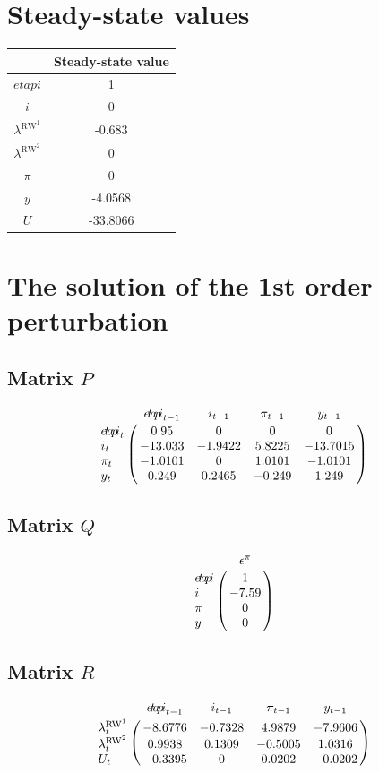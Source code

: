 

\section{Steady-state values}


\begin{tabular}{c|c|}
  & Steady-state value\\
\hline
${e\!t\!a\!p\!i}$ & 1 \\
$i$ & 0 \\
$\lambda^{\mathrm{RW}^{\mathrm{1}}}$ & -0.683 \\
$\lambda^{\mathrm{RW}^{\mathrm{2}}}$ & 0 \\
$\pi$ & 0 \\
$y$ & -4.0568 \\
$U$ & -33.8066 \\
\hline
\end{tabular}


\section{The solution of the 1st order perturbation}

\subsection*{Matrix $P$}

$$\bordermatrix{
~ & {e\!t\!a\!p\!i}_{t-1} & i_{t-1} & \pi_{t-1} & y_{t-1} \cr
{e\!t\!a\!p\!i}_{t} & 0.95 & 0 & 0 & 0 \cr
i_{t} & -13.033 & -1.9422 & 5.8225 & -13.7015 \cr
\pi_{t} & -1.0101 & 0 & 1.0101 & -1.0101 \cr
y_{t} & 0.249 & 0.2465 & -0.249 & 1.249 \cr
}$$

\subsection*{Matrix $Q$}

$$\bordermatrix{
~ & \epsilon^{\pi} \cr
{e\!t\!a\!p\!i} & 1 \cr
i & -7.59 \cr
\pi & 0 \cr
y & 0 \cr
}$$

\subsection*{Matrix $R$}

$$\bordermatrix{
~ & {e\!t\!a\!p\!i}_{t-1} & i_{t-1} & \pi_{t-1} & y_{t-1} \cr
\lambda^{\mathrm{RW}^{\mathrm{1}}}_{t} & -8.6776 & -0.7328 & 4.9879 & -7.9606 \cr
\lambda^{\mathrm{RW}^{\mathrm{2}}}_{t} & 0.9938 & 0.1309 & -0.5005 & 1.0316 \cr
U_{t} & -0.3395 & 0 & 0.0202 & -0.0202 \cr
}$$

